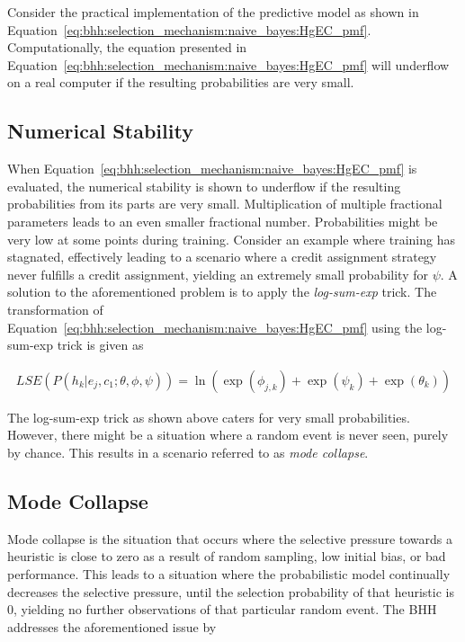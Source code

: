 Consider the practical implementation of the predictive model as shown in Equation~\eqref{eq:bhh:selection_mechanism:naive_bayes:HgEC_pmf}. Computationally, the equation presented in Equation~\eqref{eq:bhh:selection_mechanism:naive_bayes:HgEC_pmf} will underflow on a real computer if the resulting probabilities are very small.

\subsection{Numerical Stability}\label{sec:bhh:selection_mechanism:numerical_stability}

When Equation~\eqref{eq:bhh:selection_mechanism:naive_bayes:HgEC_pmf} is evaluated, the numerical stability is shown to underflow if the resulting probabilities from its parts are very small. Multiplication of multiple fractional parameters leads to an even smaller fractional number. Probabilities might be very low at some points during training. Consider an example where training has stagnated, effectively leading to a scenario where a credit assignment strategy never fulfills a credit assignment, yielding an extremely small probability for $\psi$. A solution to the aforementioned problem is to apply the \textit{log-sum-exp} trick. The transformation of Equation~\eqref{eq:bhh:selection_mechanism:naive_bayes:HgEC_pmf} using the log-sum-exp trick is given as

\begin{equation}
      \label{eq:bhh:selection_mechanism:numerical_stability:log_sum_exp}
      \begin{split}
            LSE(P(h_{k} \vert e_{j}, c_{1};  \theta, \phi, \psi)) = \ln(\exp(\phi_{j,k}) +  \exp(\psi_{k}) + \exp(\theta_{k}))
      \end{split}
\end{equation}

The log-sum-exp trick as shown above caters for very small probabilities. However, there might be a situation where a random event is never seen, purely by chance. This results in a scenario referred to as \textit{mode collapse}.

\subsection{Mode Collapse}\label{sec:bhh:selection_mechanism:mode_collapse}

Mode collapse is the situation that occurs where the selective pressure towards a heuristic is close to zero as a result of random sampling, low initial bias, or bad performance. This leads to a situation where the probabilistic model continually decreases the selective pressure, until the selection probability of that heuristic is 0, yielding no further observations of that particular random event. The \acs{BHH} addresses the aforementioned issue by

